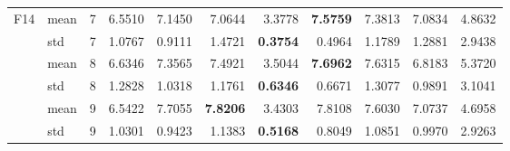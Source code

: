 \documentclass[conference]{IEEEtran}
\begin{document}
\begin{table}[]
\begin{tabular}{|c|l|l|r|r|r|r|r|r|r|r|}
\multirow{6}{*}{F14} & mean & \multicolumn{1}{r|}{7} & 6.5510 & 7.1450 & 7.0644 & 3.3778 & \textbf{7.5759} & 7.3813 & 7.0834 & 4.8632 \\ \cline{2-11} 
 & std & 7 & 1.0767 & 0.9111 & 1.4721 & \textbf{0.3754} & 0.4964 & 1.1789 & 1.2881 & 2.9438 \\ \cline{2-11} 
 & mean & \multicolumn{1}{r|}{8} & 6.6346 & 7.3565 & 7.4921 & 3.5044 & \textbf{7.6962} & 7.6315 & 6.8183 & 5.3720 \\ \cline{2-11} 
 & std & 8 & 1.2828 & 1.0318 & 1.1761 & \textbf{0.6346} & 0.6671 & 1.3077 & 0.9891 & 3.1041 \\ \cline{2-11} 
 & mean & \multicolumn{1}{r|}{9} & 6.5422 & 7.7055 & \textbf{7.8206} & 3.4303 & 7.8108 & 7.6030 & 7.0737 & 4.6958 \\ \cline{2-11} 
 & std & 9 & 1.0301 & 0.9423 & 1.1383 & \textbf{0.5168} & 0.8049 & 1.0851 & 0.9970 & 2.9263 \\ \hline
\end{tabular}
\end{table}
\end{document}

